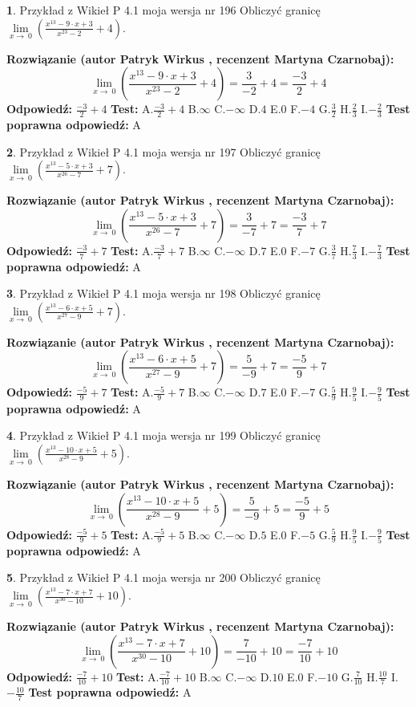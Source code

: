 \documentclass[12pt, a4paper]{article}
\theoremstyle{definition} %
\newtheorem{zad}{}
\newcommand{\zadStart}[1]{\begin{zad}#1\newline}
\newcommand{\zadStop}{\end{zad}}
\newcommand{\rozwStart}[2]{\noindent \textbf{Rozwiązanie (autor #1 , recenzent #2): }\newline}
\newcommand{\rozwStop}{\newline}
\newcommand{\odpStart}{\noindent \textbf{Odpowiedź:}\newline}
\newcommand{\odpStop}{\newline}
\newcommand{\testStart}{\noindent \textbf{Test:}\newline}
\newcommand{\testStop}{\newline}
\newcommand{\kluczStart}{\noindent \textbf{Test poprawna odpowiedź:}\newline}
\newcommand{\kluczStop}{\newline}
\begin{document}
\zadStart{Przykład z Wikieł P 4.1 moja wersja nr 196}
Obliczyć granicę $\lim\limits_{x\to\ 0}(\frac{x^{13}-9 \cdot x +3}{x^{23}-2}+4)$.
\zadStop
\rozwStart{Patryk Wirkus}{Martyna Czarnobaj}
$$\lim\limits_{x\to\ 0}(\frac{x^{13}-9 \cdot x +3}{x^{23}-2}+4)=\frac{3}{-2}+4=\frac{-3}{2}+4$$
\rozwStop
\odpStart
$\frac{-3}{2}+4$
\odpStop
\testStart
A.$\frac{-3}{2}+4$
B.$\infty$
C.$-\infty$
D.$4$
E.$0$
F.$-4$
G.$\frac{3}{2}$
H.$\frac{2}{3}$
I.$-\frac{2}{3}$
\testStop
\kluczStart
A
\kluczStop



\zadStart{Przykład z Wikieł P 4.1 moja wersja nr 197}
Obliczyć granicę $\lim\limits_{x\to\ 0}(\frac{x^{13}-5 \cdot x +3}{x^{26}-7}+7)$.
\zadStop
\rozwStart{Patryk Wirkus}{Martyna Czarnobaj}
$$\lim\limits_{x\to\ 0}(\frac{x^{13}-5 \cdot x +3}{x^{26}-7}+7)=\frac{3}{-7}+7=\frac{-3}{7}+7$$
\rozwStop
\odpStart
$\frac{-3}{7}+7$
\odpStop
\testStart
A.$\frac{-3}{7}+7$
B.$\infty$
C.$-\infty$
D.$7$
E.$0$
F.$-7$
G.$\frac{3}{7}$
H.$\frac{7}{3}$
I.$-\frac{7}{3}$
\testStop
\kluczStart
A
\kluczStop



\zadStart{Przykład z Wikieł P 4.1 moja wersja nr 198}
Obliczyć granicę $\lim\limits_{x\to\ 0}(\frac{x^{13}-6 \cdot x +5}{x^{27}-9}+7)$.
\zadStop
\rozwStart{Patryk Wirkus}{Martyna Czarnobaj}
$$\lim\limits_{x\to\ 0}(\frac{x^{13}-6 \cdot x +5}{x^{27}-9}+7)=\frac{5}{-9}+7=\frac{-5}{9}+7$$
\rozwStop
\odpStart
$\frac{-5}{9}+7$
\odpStop
\testStart
A.$\frac{-5}{9}+7$
B.$\infty$
C.$-\infty$
D.$7$
E.$0$
F.$-7$
G.$\frac{5}{9}$
H.$\frac{9}{5}$
I.$-\frac{9}{5}$
\testStop
\kluczStart
A
\kluczStop



\zadStart{Przykład z Wikieł P 4.1 moja wersja nr 199}
Obliczyć granicę $\lim\limits_{x\to\ 0}(\frac{x^{13}-10 \cdot x +5}{x^{28}-9}+5)$.
\zadStop
\rozwStart{Patryk Wirkus}{Martyna Czarnobaj}
$$\lim\limits_{x\to\ 0}(\frac{x^{13}-10 \cdot x +5}{x^{28}-9}+5)=\frac{5}{-9}+5=\frac{-5}{9}+5$$
\rozwStop
\odpStart
$\frac{-5}{9}+5$
\odpStop
\testStart
A.$\frac{-5}{9}+5$
B.$\infty$
C.$-\infty$
D.$5$
E.$0$
F.$-5$
G.$\frac{5}{9}$
H.$\frac{9}{5}$
I.$-\frac{9}{5}$
\testStop
\kluczStart
A
\kluczStop



\zadStart{Przykład z Wikieł P 4.1 moja wersja nr 200}
Obliczyć granicę $\lim\limits_{x\to\ 0}(\frac{x^{13}-7 \cdot x +7}{x^{30}-10}+10)$.
\zadStop
\rozwStart{Patryk Wirkus}{Martyna Czarnobaj}
$$\lim\limits_{x\to\ 0}(\frac{x^{13}-7 \cdot x +7}{x^{30}-10}+10)=\frac{7}{-10}+10=\frac{-7}{10}+10$$
\rozwStop
\odpStart
$\frac{-7}{10}+10$
\odpStop
\testStart
A.$\frac{-7}{10}+10$
B.$\infty$
C.$-\infty$
D.$10$
E.$0$
F.$-10$
G.$\frac{7}{10}$
H.$\frac{10}{7}$
I.$-\frac{10}{7}$
\testStop
\kluczStart
A
\kluczStop
\end{document}
